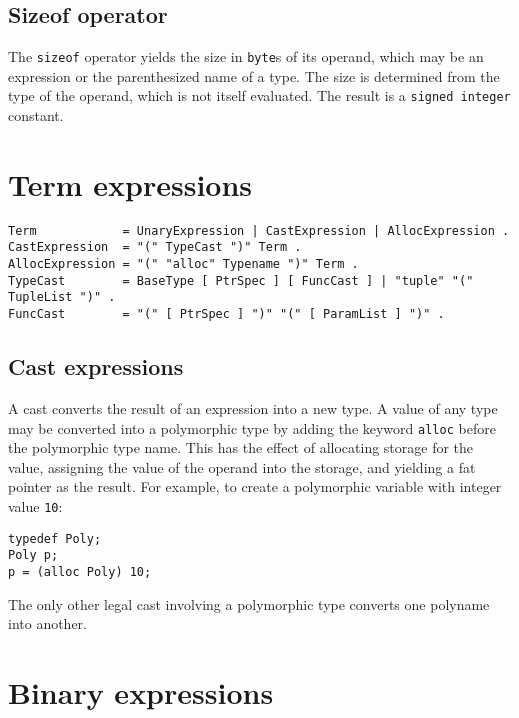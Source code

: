 \hypertarget{sizeof-operator}{%
\subsection{Sizeof operator}\label{sizeof-operator}}

The \passthrough{\lstinline!sizeof!} operator yields the size in
\passthrough{\lstinline!byte!}s of its operand, which may be an
expression or the parenthesized name of a type. The size is determined
from the type of the operand, which is not itself evaluated. The result
is a \passthrough{\lstinline!signed integer!} constant.

\hypertarget{term-expressions}{%
\section{Term expressions}\label{term-expressions}}

\begin{lstlisting}
Term            = UnaryExpression | CastExpression | AllocExpression .
CastExpression  = "(" TypeCast ")" Term .
AllocExpression = "(" "alloc" Typename ")" Term .
TypeCast        = BaseType [ PtrSpec ] [ FuncCast ] | "tuple" "(" TupleList ")" .
FuncCast        = "(" [ PtrSpec ] ")" "(" [ ParamList ] ")" .
\end{lstlisting}

\hypertarget{cast-expressions}{%
\subsection{Cast expressions}\label{cast-expressions}}

A cast converts the result of an expression into a new type. A value of
any type may be converted into a polymorphic type by adding the keyword
\passthrough{\lstinline!alloc!} before the polymorphic type name. This
has the effect of allocating storage for the value, assigning the value
of the operand into the storage, and yielding a fat pointer as the
result. For example, to create a polymorphic variable with integer value
\passthrough{\lstinline!10!}:

\begin{lstlisting}
typedef Poly;
Poly p;
p = (alloc Poly) 10;
\end{lstlisting}

The only other legal cast involving a polymorphic type converts one
polyname into another.

\hypertarget{binary-expressions}{%
\section{Binary expressions}\label{binary-expressions}}

